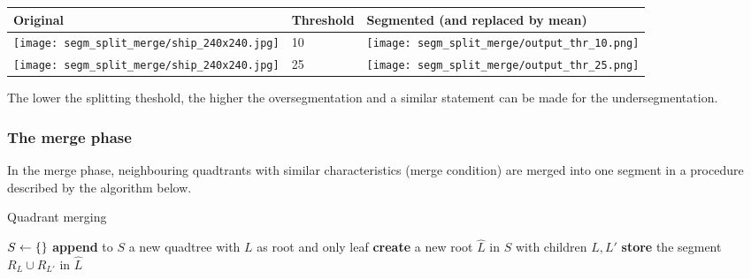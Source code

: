 \documentclass[a4paper]{article}
\begin{document}
\begin{minipage}{\linewidth}
 \label{tab:quad_tree_results} 
\begin{center}
\begin{tabular}{| m{} | m{} | m{} |}
\hline   
    \textbf{Original}  & \textbf{Threshold} & \textbf{Segmented (and replaced by mean)}  \\
\hline 
\hline
\texttt{[image: segm\_split\_merge/ship\_240x240.jpg]}  &
10 &
\texttt{[image: segm\_split\_merge/output\_thr\_10.png]}\\
\hline
\texttt{[image: segm\_split\_merge/ship\_240x240.jpg]}  &
25 &
\texttt{[image: segm\_split\_merge/output\_thr\_25.png]}\\
\hline
\end{tabular}
\end{center}
\end{minipage}
The lower the splitting theshold, the higher the oversegmentation and a similar statement can be made for the undersegmentation.





\subsubsection{The merge phase}

In the merge phase, neighbouring quadtrants with similar characteristics (merge condition) are merged into one segment in a procedure described by the algorithm below.
\begin{algorithm}[H]
\caption{Quadrant merging}\label{alg:region_quadrant_merging}
\begin{algorithmic}[1]
 
\State $S \gets \textup\{\}$ 
\State \textbf{append} to $S$ a new quadtree with $L$ as root and only leaf
\EndFor
{}
 
\State \textbf{create} a new root $\hat{L}$ in $S$ with children $L,L'$
\State \textbf{store} the segment $R_L \cup R_{L'}$ in $\hat{L}$
\EndIf
\EndFor
\EndFor
\EndProcedure
\end{algorithmic}
\end{algorithm}
\end{document}
